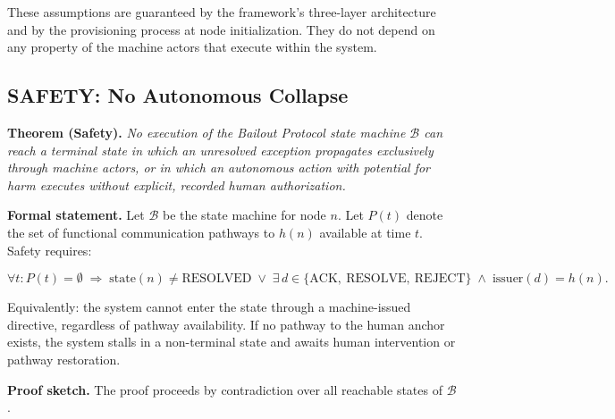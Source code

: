 These assumptions are guaranteed by the \bxthree{} framework's three-layer architecture
and by the provisioning process at node initialization. They do not depend on any
property of the machine actors that execute within the system.

\subsection{SAFETY: No Autonomous Collapse}
\label{sec:safety}

\textbf{Theorem (Safety).} \emph{No execution of the Bailout Protocol state machine
$\mathcal{B}$ can reach a terminal state in which an unresolved exception propagates
exclusively through machine actors, or in which an autonomous action with potential for
harm executes without explicit, recorded human authorization.}

\medskip
\noindent\textbf{Formal statement.} Let $\mathcal{B}$ be the state machine for node $n$.
Let $P(t)$ denote the set of functional communication pathways to $h(n)$ available at
time $t$. Safety requires:

\begin{equation}
\label{eq:safety}
\forall t : P(t) = \emptyset \;\Longrightarrow\;
\text{state}(n) \neq \text{RESOLVED}
\;\lor\;
\exists\, d \in \{\text{ACK},\ \text{RESOLVE},\ \text{REJECT}\} \;\land\; \text{issuer}(d) = h(n).
\end{equation}

Equivalently: the system cannot enter the  state through a machine-issued
directive, regardless of pathway availability. If no pathway to the human anchor
exists, the system stalls in a non-terminal state and awaits human intervention or
pathway restoration.

\medskip
\noindent\textbf{Proof sketch.} The proof proceeds by contradiction over all reachable
states of $\mathcal{B}$.

